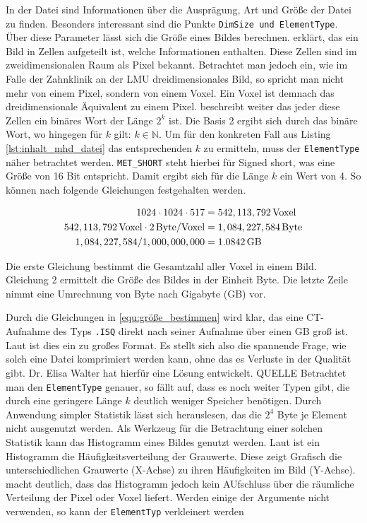 In der Datei sind Informationen über die Ausprägung, Art und Größe der Datei zu
finden. Besonders interessant sind die Punkte \texttt{DimSize und ElementType}. Über
diese Parameter lässt sich die Größe eines Bildes berechnen. \citet[Seite 10-11]{burger2009}
erklärt, das ein Bild in Zellen aufgeteilt ist, welche Informationen enthalten. Diese
Zellen sind im zweidimensionalen Raum als Pixel bekannt. Betrachtet man jedoch
ein, wie im Falle der Zahnklinik an der LMU dreidimensionales Bild, so spricht
man nicht mehr von einem Pixel, sondern von einem Voxel. Ein Voxel ist demnach
das dreidimensionale Äquivalent zu einem Pixel. \citet[Seite 10-11]{burger2009} beschreibt
weiter das jeder diese Zellen ein binäres Wort der Länge $2^{k}$ ist. Die Basis
2 ergibt sich durch das binäre Wort, wo hingegen für $k$ gilt:
$k \in \mathbb{N}$. Um für den konkreten Fall aus Listing \ref{lst:inhalt_mhd_datei}
das entsprechenden $k$ zu ermitteln, muss der \texttt{ElementType} näher betrachtet
werden. \texttt{MET\_SHORT} steht hierbei für Signed short, was eine Größe von
16 Bit entspricht. Damit ergibt sich für die Länge $k$ ein Wert von 4. So können
nach \citet[Seite 10-11]{burger2009} folgende Gleichungen festgehalten werden.

\begin{align}
	\label{equ:größe_bestimmen}1024 \cdot 1024 \cdot 517    & = 542,113,792 \, \text{Voxel}\notag  \\
	542,113,792 \, \text{Voxel}\cdot 2 \, \text{Byte/Voxel} & = 1,084,227,584 \, \text{Byte}\notag \\
	1,084,227,584 / 1,000,000,000                           & = 1.0842 \, \text{GB}
\end{align}

Die erste Gleichung bestimmt die Gesamtzahl aller Voxel in einem Bild. Gleichung
2 ermittelt die Größe des Bildes in der Einheit Byte. Die letzte Zeile nimmt
eine Umrechnung von Byte nach Gigabyte (GB) vor.

Durch die Gleichungen in \ref{equ:größe_bestimmen} wird klar, das eine CT-Aufnahme
des Typs \texttt{.ISQ} direkt nach seiner Aufnahme über einen GB groß ist. Laut \citet{poliklinikLMU}
ist dies ein zu großes Format. Es stellt sich also die spannende Frage, wie
solch eine Datei komprimiert werden kann, ohne das es Verluste in der Qualität gibt.
Dr. Elisa Walter hat hierfür eine Lösung entwickelt. QUELLE Betrachtet man den
\texttt{ElementType} genauer, so fällt auf, dass es noch weiter Typen gibt, die
durch eine geringere Länge $k$ deutlich weniger Speicher benötigen. Durch Anwendung
simpler Statistik lässt sich herauslesen, das die $2^{4}$ Byte je Element nicht
ausgenutzt werden. Als Werkzeug für die Betrachtung einer solchen Statistik kann
das Histogramm eines Bildes genutzt werden. Laut \citet[Seite 249]{jahne2024}
ist ein Histogramm die Häufigkeitsverteilung der Grauwerte. Diese zeigt Grafisch
die unterschiedlichen Grauwerte (X-Achse) zu ihren Häufigkeiten im Bild (Y-Achse).
\citet[Seite 249]{jahne2024} macht deutlich, dass das Histogramm jedoch kein AUfschluss
über die räumliche Verteilung der Pixel oder Voxel liefert. Werden einige der
Argumente nicht verwenden, so kann der \texttt{ElementTyp} verkleinert werden

